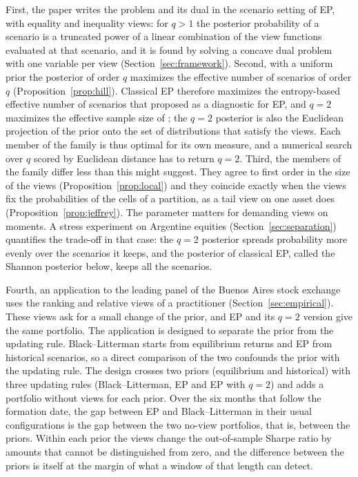 \documentclass[11pt]{article}
\begin{document}
First, the paper writes the problem and its dual in
the scenario setting of EP, with equality and inequality views: for $q>1$
the posterior probability of a scenario is a truncated power of a linear
combination of the view functions evaluated at that scenario, and it is
found by solving a concave dual problem with one variable per
view (Section~\ref{sec:framework}). Second, with a uniform prior the posterior of
order $q$ maximizes the effective number of scenarios of order $q$
(Proposition~\ref{prop:hill}). Classical EP therefore maximizes the
entropy-based effective number of scenarios that \citet{Meucci2012}
proposed as a diagnostic for EP, and $q=2$ maximizes the effective sample
size of \citet{Kish1965}; the $q=2$ posterior is also the Euclidean
projection of the prior onto the set of distributions that satisfy the
views. Each member of the family is thus optimal for its own measure, and a
numerical search over $q$ scored by Euclidean distance has to return $q=2$.
Third, the members of the family differ less than this might suggest. They
agree to first order in the size of the views
(Proposition~\ref{prop:local}) and they coincide exactly when the views fix
the probabilities of the cells of a partition, as a tail view on one asset
does (Proposition~\ref{prop:jeffrey}). The parameter matters for demanding views
on moments. A stress experiment on Argentine equities
(Section~\ref{sec:separation}) quantifies the trade-off in that case: the
$q=2$ posterior spreads probability more evenly over the scenarios it
keeps, and the posterior of classical EP, called the Shannon posterior
below, keeps all the scenarios.

Fourth, an application to the leading panel of the Buenos Aires stock
exchange uses the ranking and relative views of a practitioner
(Section~\ref{sec:empirical}). These views ask for a small change of the prior, and
EP and its $q=2$ version give the same portfolio. The application is
designed to separate the prior from the updating rule. Black--Litterman
starts from equilibrium returns and EP from historical scenarios, so a
direct comparison of the two confounds the prior with the updating rule.
The design crosses two priors (equilibrium and historical) with three
updating rules (Black--Litterman, EP and EP with $q=2$) and adds a
portfolio without views for each prior. Over the six months that follow
the formation date, the gap between EP and Black--Litterman in their usual
configurations is the gap between the two no-view portfolios, that is,
between the priors. Within each prior the views change the out-of-sample
Sharpe ratio by amounts that cannot be distinguished from zero, and the
difference between the priors is itself at the margin of what a window of
that length can detect.
\end{document}
